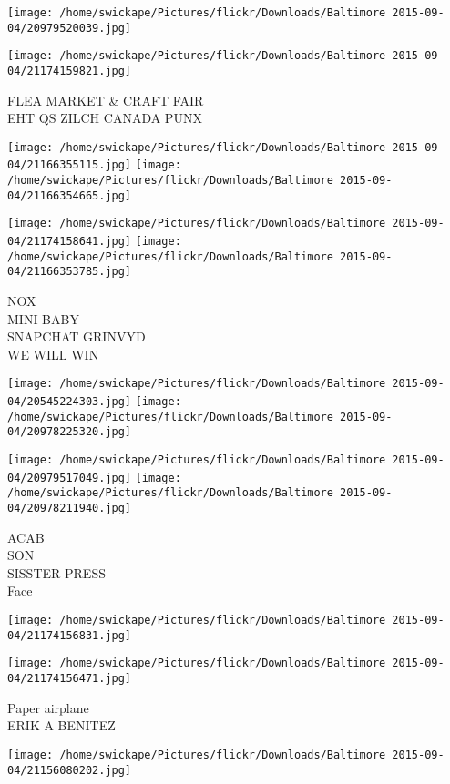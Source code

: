 \documentclass[10pt,letterpaper]{article}
\begin{document}
\texttt{[image: /home/swickape/Pictures/flickr/Downloads/Baltimore 2015-09-04/20979520039.jpg]}

\vspace{0.25in}
\texttt{[image: /home/swickape/Pictures/flickr/Downloads/Baltimore 2015-09-04/21174159821.jpg]}

FLEA MARKET \& CRAFT FAIR\\
EHT QS ZILCH CANADA PUNX
\pagebreak

\texttt{[image: /home/swickape/Pictures/flickr/Downloads/Baltimore 2015-09-04/21166355115.jpg]}
\texttt{[image: /home/swickape/Pictures/flickr/Downloads/Baltimore 2015-09-04/21166354665.jpg]}

\texttt{[image: /home/swickape/Pictures/flickr/Downloads/Baltimore 2015-09-04/21174158641.jpg]}
\texttt{[image: /home/swickape/Pictures/flickr/Downloads/Baltimore 2015-09-04/21166353785.jpg]}

NOX\\
MINI BABY\\
SNAPCHAT GRINVYD\\
WE WILL WIN
\pagebreak

\texttt{[image: /home/swickape/Pictures/flickr/Downloads/Baltimore 2015-09-04/20545224303.jpg]}
\texttt{[image: /home/swickape/Pictures/flickr/Downloads/Baltimore 2015-09-04/20978225320.jpg]}

\texttt{[image: /home/swickape/Pictures/flickr/Downloads/Baltimore 2015-09-04/20979517049.jpg]}
\texttt{[image: /home/swickape/Pictures/flickr/Downloads/Baltimore 2015-09-04/20978211940.jpg]}

ACAB\\
SON\\
SISSTER PRESS\\
Face
\pagebreak

\texttt{[image: /home/swickape/Pictures/flickr/Downloads/Baltimore 2015-09-04/21174156831.jpg]}

\vspace{0.25in}
\texttt{[image: /home/swickape/Pictures/flickr/Downloads/Baltimore 2015-09-04/21174156471.jpg]}

Paper airplane\\
ERIK A BENITEZ
\pagebreak

\texttt{[image: /home/swickape/Pictures/flickr/Downloads/Baltimore 2015-09-04/21156080202.jpg]}
\end{document}
